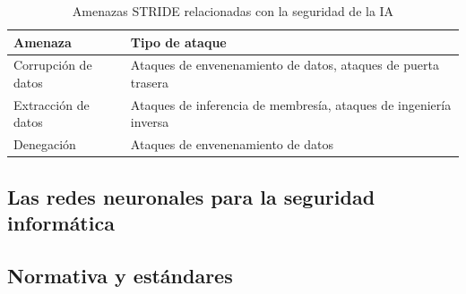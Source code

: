 \begin{table}[H]
    \centering
    \small
    \begin{tabularx}{\textwidth}{|l|X|}
        \hline
        \textbf{Amenaza}    & \textbf{Tipo de ataque}                                           \\
        \hline
        Corrupción de datos & Ataques de envenenamiento de datos, ataques de puerta trasera     \\
        Extracción de datos & Ataques de inferencia de membresía, ataques de ingeniería inversa \\
        Denegación          & Ataques de envenenamiento de datos                                \\
        \hline
    \end{tabularx}
    \caption{Amenazas STRIDE relacionadas con la seguridad de la IA}
    \label{tab:amenazas}
\end{table}


\subsection{Las redes neuronales para la seguridad informática}







\subsection{Normativa y estándares}










